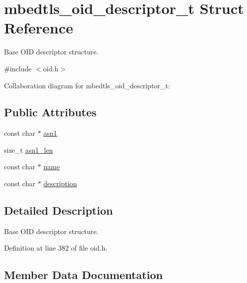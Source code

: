 \hypertarget{structmbedtls__oid__descriptor__t}{}\section{mbedtls\+\_\+oid\+\_\+descriptor\+\_\+t Struct Reference}
\label{structmbedtls__oid__descriptor__t}


Base O\+ID descriptor structure.  




{\ttfamily \#include $<$oid.\+h$>$}



Collaboration diagram for mbedtls\+\_\+oid\+\_\+descriptor\+\_\+t\+:
\subsection*{Public Attributes}
\begin{DoxyCompactItemize}
\item 
const char $\ast$ \mbox{\hyperlink{structmbedtls__oid__descriptor__t_a9a0c9f82eed2f753d0fa0c4727c21ffa}{asn1}}
\item 
size\+\_\+t \mbox{\hyperlink{structmbedtls__oid__descriptor__t_a99525f8a87473843e282f79ee07e5f9f}{asn1\+\_\+len}}
\item 
const char $\ast$ \mbox{\hyperlink{structmbedtls__oid__descriptor__t_a096eb054c65a0735f77c3431097c2aa4}{name}}
\item 
const char $\ast$ \mbox{\hyperlink{structmbedtls__oid__descriptor__t_a5b447674c65045cf4f855bd1c728f109}{description}}
\end{DoxyCompactItemize}


\subsection{Detailed Description}
Base O\+ID descriptor structure. 

Definition at line 382 of file oid.\+h.



\subsection{Member Data Documentation}
\mbox{\label{structmbedtls__oid__descriptor__t_a9a0c9f82eed2f753d0fa0c4727c21ffa}} 
